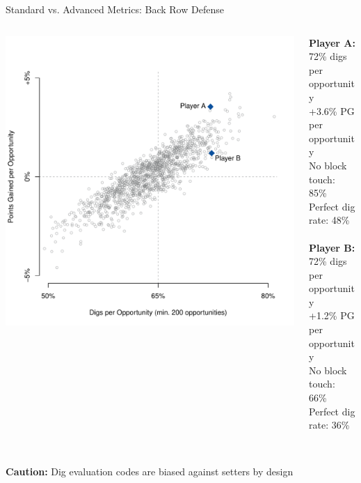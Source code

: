 \documentclass[handout]{beamer}
\begin{document}
\begin{frame}{Standard vs. Advanced Metrics: Back Row Defense}
  \begin{columns}
    \begin{column}{0.59\textwidth}
      \includegraphics[width = \textwidth]{images/dig_comparison.pdf}
    \end{column}
    \begin{column}{0.41\textwidth}
      {\bf Player A:}\\
      72\% digs per opportunity\\
      +3.6\% PG per opportunity\\
      {
        \color{white}
        No block touch: 85\%\\
        Perfect dig rate: 48\%\\
      }
      ~\\
      {\bf Player B:}\\
      72\% digs per opportunity\\
      +1.2\% PG per opportunity\\
      {
        \color{white}
        No block touch: 66\%\\
        Perfect dig rate: 36\%\\
      }
    \end{column}
  \end{columns}
  ~\\
  {\bf Caution:} Dig evaluation codes are biased against setters by design
\end{frame}
\end{document}

